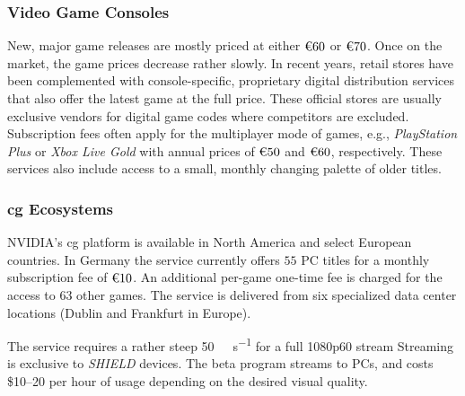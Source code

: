




\subsubsection{Video Game Consoles}

New, major game releases are mostly priced at either
$\text{\texteuro} 60$ or $\text{\texteuro} 70$. Once on the market, the
game prices decrease rather slowly. In recent years, retail stores have
been complemented with console-specific, proprietary digital
distribution services that also offer the latest game at the full price.
These official stores are usually exclusive vendors for digital game
codes where competitors are excluded.
Subscription fees often apply for the multiplayer mode of games, e.g.,
\textit{PlayStation Plus} or \textit{Xbox Live Gold} with annual prices
of $\text{\texteuro} 50$ and $\text{\texteuro} 60$, respectively. These
services also include access to a small, monthly changing palette of
older titles.




\subsubsection{\Gls{cg} Ecosystems}

NVIDIA's \gls{cg} platform%
\gfnow
is available in North America and select European countries.
In Germany the service currently offers $55$ PC titles
for a monthly subscription fee of $\text{\texteuro} 10$. An additional
per-game one-time fee
is charged for the access to $63$ other games.
The service is delivered from six
specialized data center locations (Dublin and Frankfurt in Europe).

The service requires a rather steep
\SI{50}{\mega\bit\per\second} for a full
1080p60 stream%
Streaming is exclusive to \textit{SHIELD} devices.
The \gfnowpc beta program streams to \glspl{PC}, and costs
\$\SIrange{10}{20}{} per hour of usage depending on the desired
visual quality.

